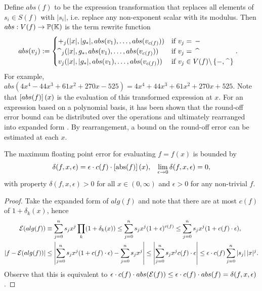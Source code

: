 \documentclass[]{elsarticle}
\begin{document}
Define $abs(f)$ to be the expression transformation that replaces all elements of $s_i\in S(f)$ with $|s_i|$, i.e. replace any non-exponent scalar with its modulus. Then $abs:V(f)\rightarrow \mathbb{P}(\mathbb{K})$ is the term rewrite function
\begin{align*}
	abs(v_j) &:= \begin{cases}
		+_j(|x|,|g_*|,abs(v_1),\dots,abs(v_{c(f)})) & \text{if }v_j =\, - \\
		\widehat{\,\,}\,_j(|x|,g_*,abs(v_1),\dots,abs(v_{c(f)})) & \text{if } v_j =\, \widehat{\ \ } \\
		v_j(|x|,|g_*|,abs(v_1),\dots,abs(v_{c(f)})) & \text{if } v_j \in V(f)\bs\set{-,\widehat{\ \ }} %
	\end{cases}.
\end{align*}
For example, $abs(4x^4-44x^3+61x^2+270x-525) = 4x^4+44x^3+61x^2+270x+525$.
Note that $\left[abs(f)\right](x)$ is the evaluation of this transformed expression at $x$.
For an expression based on a polynomial basis, it has been shown that the round-off error bound can be distributed over the operations and ultimately rearranged into expanded form \cite{demmel}. By rearrangement, a bound on the round-off error can be estimated at each $x$.

\begin{theorem}
	The maximum floating point error for evaluating $f=f(x)$ is bounded by
	\begin{align*}
		\delta(f,x,\epsilon) &= \epsilon\cdot c(f)\cdot \left[\text{abs}(f)\right](x), & \lim_{\epsilon\rightarrow0}\delta(f,x,\epsilon) = 0,
	\end{align*}
	with property $\delta(f,x,\epsilon)>0$ for all $x\in(0,\infty)$ and $\epsilon>0$ for any non-trivial $f$. %
\end{theorem}
\begin{proof}
	Take the expanded form of $alg(f)$ and note that there are at most $c(f)$ of $1+\delta_k(x)$, hence
	\begin{align*}
		\mathcal{E}(alg(f)) &\equiv \sum_{j=0}^n s_jx^j\prod_k(1+\delta_k(x)) \leq \sum_{j=0}^n s_j x^j (1+\epsilon)^{c(f)} \leq \sum_{j=0}^n s_jx^j(1+c(f)\cdot\epsilon), \\
		\left|f-\mathcal{E}(alg(f))\right| &\leq \left|\sum_{j=0}^n s_j x^j(1+c(f)\cdot\epsilon)-\sum_{j=0}^ns_jx^j\right| \leq \left|\sum_{j=0}^n s_j x^j c(f)\cdot \epsilon\right| \leq \epsilon\cdot c(f)\sum_{j=0}^n|s_j|\,|x|^j.
	\end{align*}
	Observe that this is equivalent to $\epsilon\cdot c(f)\cdot abs(\mathcal{E}(f)) \leq \epsilon\cdot c(f)\cdot abs(f) = \delta(f,x,\epsilon)$.
\end{proof}
\end{document}
